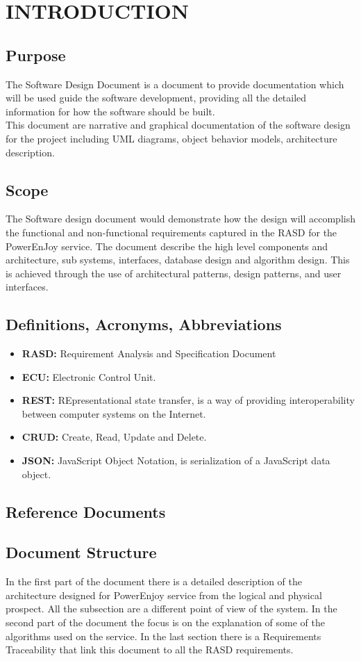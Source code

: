 \section{INTRODUCTION}
\subsection{Purpose}
The Software Design Document is a document to provide documentation which will be used guide the software development, providing all the detailed information for how the software should be built.\\
This document are narrative and graphical documentation of the software design for the project including UML diagrams, object behavior models, architecture description.
\subsection{Scope}
The Software design document would demonstrate how the design will accomplish the functional and non-functional requirements captured in the RASD for the PowerEnJoy service.
The document describe the high level components and architecture, sub systems, interfaces, database design and algorithm design. This is achieved through the use of architectural patterns, design patterns, and user interfaces. 
\subsection{Definitions, Acronyms, Abbreviations}
\begin{itemize}
	\item \textbf{RASD:} Requirement Analysis and Specification Document
	\item \textbf{ECU:} Electronic Control Unit. 
	\item \textbf{REST:} REpresentational state transfer, is a way of providing interoperability between computer systems on the Internet.
	\item \textbf{CRUD:} Create, Read, Update and Delete.
	\item \textbf{JSON:} JavaScript Object Notation, is serialization of a JavaScript data object.
\end{itemize}
\subsection{Reference Documents}
\subsection{Document Structure }
In the first part of the document there is a detailed description of the architecture designed for PowerEnjoy service from the logical and physical prospect. All the subsection are a different point of view of the system.
In the second part of the document the focus is on the explanation of some of the algorithms used on the service. In the last section there is a Requirements Traceability that link this document to all the RASD requirements.


\newpage